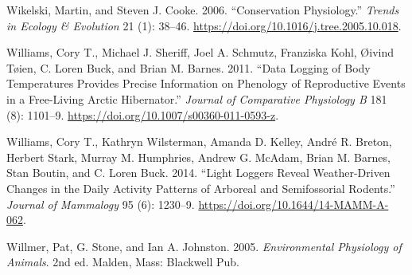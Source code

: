 \documentclass[msc,numbers,hidelinks]{coppe}
\newlength{\cslhangindent}
\newenvironment{cslreferences}%
  {\setlength{\parindent}{0pt}%
  \everypar{\setlength{\hangindent}{\cslhangindent}}\ignorespaces}%
  {\par}
\begin{document}
\begin{cslreferences}
  \leavevmode\hypertarget{ref-wikelskiConservationPhysiology2006}{}%
  Wikelski, Martin, and Steven J. Cooke. 2006. ``Conservation Physiology.'' \emph{Trends in Ecology \& Evolution} 21 (1): 38--46. \url{https://doi.org/10.1016/j.tree.2005.10.018}.

  \leavevmode\hypertarget{ref-williamsDataLoggingBody2011}{}%
  Williams, Cory T., Michael J. Sheriff, Joel A. Schmutz, Franziska Kohl, Øivind Tøien, C. Loren Buck, and Brian M. Barnes. 2011. ``Data Logging of Body Temperatures Provides Precise Information on Phenology of Reproductive Events in a Free-Living Arctic Hibernator.'' \emph{Journal of Comparative Physiology B} 181 (8): 1101--9. \url{https://doi.org/10.1007/s00360-011-0593-z}.

  \leavevmode\hypertarget{ref-williamsLightLoggersReveal2014}{}%
  Williams, Cory T., Kathryn Wilsterman, Amanda D. Kelley, André R. Breton, Herbert Stark, Murray M. Humphries, Andrew G. McAdam, Brian M. Barnes, Stan Boutin, and C. Loren Buck. 2014. ``Light Loggers Reveal Weather-Driven Changes in the Daily Activity Patterns of Arboreal and Semifossorial Rodents.'' \emph{Journal of Mammalogy} 95 (6): 1230--9. \url{https://doi.org/10.1644/14-MAMM-A-062}.

  \leavevmode\hypertarget{ref-willmerEnvironmentalPhysiologyAnimals2005}{}%
  Willmer, Pat, G. Stone, and Ian A. Johnston. 2005. \emph{Environmental Physiology of Animals}. 2nd ed. Malden, Mass: Blackwell Pub.
  \end{cslreferences}
\end{document}
